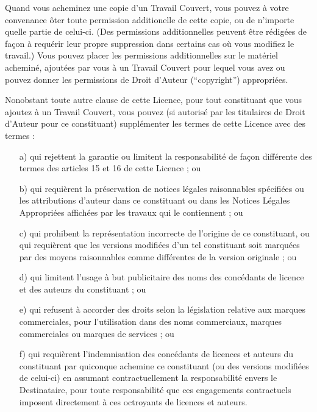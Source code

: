 {Quand vous acheminez une copie d’un Travail Couvert, vous pouvez à
votre convenance ôter toute permission additionelle de cette copie, ou
de n’importe quelle partie de celui-ci. (Des permissions
additionnelles peuvent être rédigées de façon à requérir leur propre
suppression dans certains cas où vous modifiez le travail.) Vous
pouvez placer les permissions additionnelles sur le matériel acheminé,
ajoutées par vous à un Travail Couvert pour lequel vous avez ou pouvez
donner les permissions de Droit d’Auteur (“copyright”) appropriées.

Nonobstant toute autre clause de cette Licence, pour tout constituant
que vous ajoutez à un Travail Couvert, vous pouvez (si autorisé par les
titulaires de Droit d’Auteur pour ce constituant) supplémenter les
termes de cette Licence avec des termes :
\begin{enumerate}
\item [a)] qui rejettent la garantie ou limitent la responsabilité de façon
     différente des termes des articles 15 et 16 de cette Licence ; ou
\item [b)] qui requièrent la préservation de notices légales raisonnables
     spécifiées ou les attributions d’auteur dans ce constituant ou
     dans les Notices Légales Appropriées affichées par les travaux qui
     le contiennent ; ou

\item [c)] qui prohibent la représentation incorrecte de l’origine de ce
     constituant, ou qui requièrent que les versions modifiées d’un tel
     constituant soit marquées par des moyens raisonnables comme
     différentes de la version originale ; ou

\item [d)] qui limitent l’usage à but publicitaire des noms des concédants de
     licence et des auteurs du constituant ; ou

\item [e)]  qui refusent à accorder des droits selon la législation relative
     aux marques commerciales, pour l’utilisation dans des noms
     commerciaux, marques commerciales ou marques de services ; ou

\item [f)] qui requièrent l’indemnisation des concédants de licences et
     auteurs du constituant par quiconque achemine ce constituant (ou
     des versions modifiées de celui-ci) en assumant contractuellement
     la responsabilité envers le Destinataire, pour toute
     responsabilité que ces engagements contractuels imposent
     directement à ces octroyants de licences et auteurs.
\end{enumerate}

}
